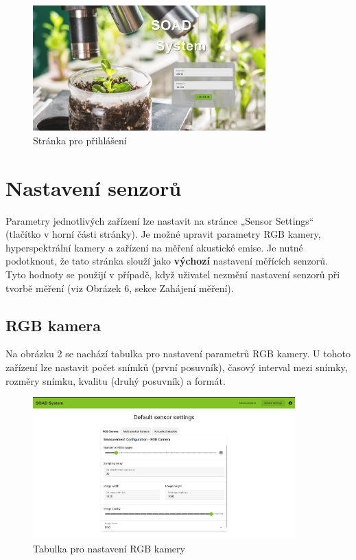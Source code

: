 \documentclass[12pt]{article}
\begin{document}
\begin{teamwork}
        \begin{figure}[hbt!]
            \centering
            \includegraphics[width=0.8\textwidth]{../../img/main_page}
            \caption{Stránka pro přihlášení}
            \label{fig:tlacitko_pro_prih}
        \end{figure}

        \section{Nastavení senzorů}\label{sec:nastaveni-senzoru}

        Parametry jednotlivých zařízení lze nastavit na stránce „Sensor Settings“ (tlačítko v horní části stránky).
        Je možné upravit parametry RGB kamery, hyperspektrální kamery a zařízení na měření akustické emise.
        Je nutné podotknout, že tato stránka slouží jako \textbf{výchozí} nastavení měřících senzorů.
        Tyto hodnoty se použijí v případě, když uživatel nezmění nastavení senzorů při tvorbě měření (viz Obrázek 6, sekce Zahájení měření).

        \subsection{RGB kamera}\label{subsec:rgb-kamera}

        Na obrázku 2 se nachází tabulka pro nastavení parametrů RGB kamery.
        U tohoto zařízení lze nastavit počet snímků (první posuvník), časový interval mezi snímky, rozměry snímku, kvalitu (druhý posuvník) a formát.

        \begin{figure}[hbt!]
            \centering
            \includegraphics[width=0.9\textwidth]{../../img/rgb_cam_settings}
            \caption{Tabulka pro nastavení RGB kamery}
            \label{fig:rgb_cam_settings}
        \end{figure}


\end{teamwork}
\end{document}
